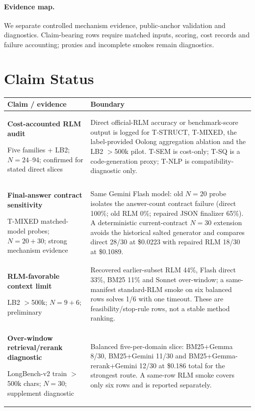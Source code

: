 \documentclass[letterpaper]{article}
\begin{document}
\paragraph{Evidence map.}
We separate controlled mechanism evidence, public-anchor validation and diagnostics. Claim-bearing rows require matched inputs, scoring, cost records and failure accounting; proxies and incomplete smokes remain diagnostics.

\section{Claim Status}

\begin{table}[!htbp]
\centering
\small
\setlength{\tabcolsep}{3pt}
\begin{tabular}{@{}p{2.15cm}p{4.55cm}@{}}
\toprule
\textbf{Claim / evidence} & \textbf{Boundary} \\
\midrule
\textbf{Cost-accounted RLM audit}\par Five families + LB2; $N=24$--94; confirmed for stated direct slices & Direct official-RLM accuracy or benchmark-score output is logged for T-STRUCT, T-MIXED, the label-provided Oolong aggregation ablation and the LB2 $>$500k pilot. T-SEM is cost-only; T-SQ is a code-generation proxy; T-NLP is compatibility-diagnostic only. \\
\textbf{Final-answer contract sensitivity}\par T-MIXED matched-model probes; $N=20+30$; strong mechanism evidence & Same Gemini Flash model: old $N=20$ probe isolates the answer-count contract failure (direct 100\%; old RLM 0\%; repaired JSON finalizer 65\%). A deterministic current-contract $N=30$ extension avoids the historical salted generator and compares direct 28/30 at \$0.0223 with repaired RLM 18/30 at \$0.1089. \\
\textbf{RLM-favorable context limit}\par LB2 $>$500k; $N=9+6$; preliminary & Recovered earlier-subset RLM 44\%, Flash direct 33\%, BM25 11\% and Sonnet over-window; a same-manifest standard-RLM smoke on six balanced rows solves 1/6 with one timeout. These are feasibility/stop-rule rows, not a stable method ranking. \\
\textbf{Over-window retrieval/rerank diagnostic}\par LongBench-v2 train $>$500k chars; $N=30$; supplement diagnostic & Balanced five-per-domain slice: BM25+Gemma 8/30, BM25+Gemini 11/30 and BM25+Gemma-rerank+Gemini 12/30 at \$0.186 total for the strongest route. A same-row RLM smoke covers only six rows and is reported separately. \\

\end{tabular}
\end{table}
\end{document}
